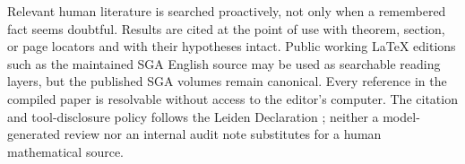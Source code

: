 Relevant human literature is searched proactively, not only when a remembered
fact seems doubtful.  Results are cited at the point of use with theorem,
section, or page locators and with their hypotheses intact.  Public working
\LaTeX{} editions such as the maintained SGA English source
\cite{SGAEnglish2026} may be used as searchable reading layers, but the
published SGA volumes \cite{SGA7I1972,SGA7II1973} remain canonical.  Every
reference in the compiled paper is resolvable without access to the editor's
computer.  The citation and tool-disclosure policy follows the Leiden
Declaration \cite{Leiden2026}; neither a model-generated review nor an
internal audit note substitutes for a human mathematical source.
